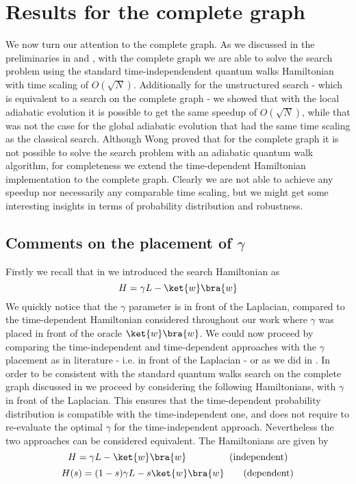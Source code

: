 \section{Results for the complete graph}
We now turn our attention to the complete graph. As we discussed in the preliminaries in  and , with the complete graph we are able to solve the search problem using the standard time-independendent quantum walks Hamiltonian with time scaling of $O(\sqrt{N})$. Additionally for the unstructured search - which is equivalent to a search on the complete graph - we showed that with the local adiabatic evolution it is possible to get the same speedup of $O(\sqrt{N})$, while that was not the case for the global adiabatic evolution that had the same time scaling as the classical search. Although Wong proved that for the complete graph it is not possible to solve the search problem with an adiabatic quantum walk algorithm, for completeness we extend the time-dependent Hamiltonian implementation to the complete graph. Clearly we are not able to achieve any speedup nor necessarily any comparable time scaling, but we might get some interesting insights in terms of probability distribution and robustness.

    \subsection{Comments on the placement of $\gamma$}
    Firstly we recall that in  we introduced the search Hamiltonian as
    \begin{equation}
      H = \gamma L -\ket{w}\bra{w}
    \end{equation}
    We quickly notice that the $\gamma$ parameter is in front of the Laplacian, compared to the time-dependent Hamiltonian considered throughout our work where $\gamma$ was placed in front of the oracle $\ket{w}\bra{w}$. We could now proceed by comparing the time-independent and time-dependent approaches with the $\gamma$ placement as in literature - i.e. in front of the Laplacian - or as we did in . In order to be consistent with the standard quantum walks search on the complete graph discussed in  we proceed by considering the following Hamiltonians, with $\gamma$ in front of the Laplacian. This ensures that the time-dependent probability distribution is compatible with the time-independent one, and does not require to re-evaluate the optimal $\gamma$ for the time-independent approach. Nevertheless the two approaches can be considered equivalent. The Hamiltonians are given by
    \begin{equation}
      H = \gamma L-\ket{w}\bra{w}\hspace{45pt}\mbox{(independent)}
    \end{equation}
    \vspace{-0.5cm}
    \begin{equation}
      H(s) = (1-s)\gamma L - s\ket{w}\bra{w}\hspace{20pt}\mbox{(dependent)}
    \end{equation}\\


